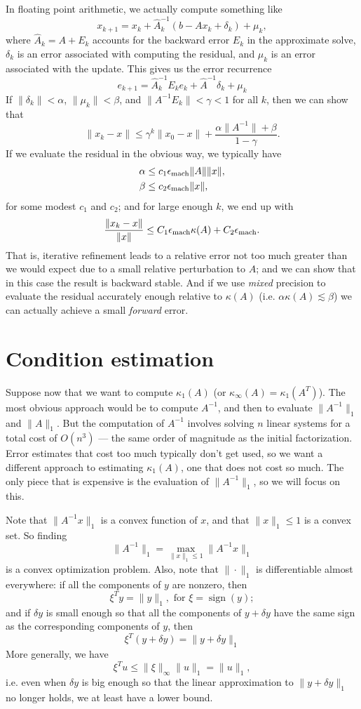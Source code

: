 \documentclass[12pt, leqno]{article} %
\begin{document}
In floating point arithmetic, we actually compute something like
\[
  x_{k+1} = x_k + \hat{A}_k^{-1} (b - A x_{k} + \delta_k) + \mu_k,
\]
where $\hat{A}_k = A + E_k$ accounts for the backward
error $E_k$ in the approximate solve,
$\delta_k$ is an error associated with computing the residual, and
$\mu_k$ is an error associated with the update.  This gives us the
error recurrence
\[
  e_{k+1} = \hat{A}_k^{-1} E_k e_k + \hat{A}^{-1} \delta_k + \mu_k
\]
If $\|\delta_k\| < \alpha$, $\|\mu_k\| < \beta$,
and $\|A^{-1} E_k\| < \gamma < 1$ for all $k$, then
we can show that
\[
  \|x_k-x\| \leq
    \gamma^k \|x_0-x\| +
    \frac{ \alpha \|A^{-1}\| + \beta }{1 - \gamma}.
\]
If we evaluate the residual in the obvious way, we typically have
\begin{align*}
  \alpha & \leq c_1 \epsilon_{\mathrm{mach}} \|A\| \|x\|, \\
  \beta & \leq c_2 \epsilon_{\mathrm{mach}} \|x\|,
\end{align*}
for some modest $c_1$ and $c_2$; and for large enough $k$, we end up with
\[
  \frac{\|x_k-x\|}{\|x\|} \leq C_1 \epsilon_{\mathrm{mach}} \kappa(A) + C_2 \epsilon_{\mathrm{mach}}.
\]
That is, iterative refinement leads to a relative error not too much
greater than we would expect due to a small relative perturbation to $A$;
and we can show that in this case the result is backward stable.
And if we use {\em mixed} precision to evaluate the residual accurately
enough relative to $\kappa(A)$ (i.e. $\alpha \kappa(A) \lesssim \beta$)
we can actually achieve a small {\em forward} error.


\section{Condition estimation}

Suppose now that we want to compute $\kappa_1(A)$
(or $\kappa_{\infty}(A) = \kappa_1(A^T)$).
The most obvious approach would be to compute $A^{-1}$, and then
to evaluate $\|A^{-1}\|_1$ and $\|A\|_1$.  But the computation of
$A^{-1}$ involves solving $n$ linear systems for a total cost of $O(n^3)$ ---
the same order of magnitude as the initial factorization.  Error estimates
that cost too much typically don't get used, so we want a different approach
to estimating $\kappa_1(A)$, one that does not cost so much.  The only piece
that is expensive is the evaluation of $\|A^{-1}\|_1$, so we will focus
on this.

Note that $\|A^{-1} x\|_1$ is a convex function of $x$, and that
$\|x\|_1 \leq 1$ is a convex set.  So finding
\[
  \|A^{-1}\|_1 = \max_{\|x\|_1 \leq 1} \|A^{-1} x\|_1
\]
is a convex optimization problem.  Also, note that $\|\cdot\|_1$ is
differentiable almost everywhere: if all the components of $y$ are
nonzero, then
\[
  \xi^T y = \|y\|_1, \mbox{ for } \xi = \operatorname{sign}(y);
\]
and if $\delta y$ is small enough so that all the components of $y + \delta y$
have the same sign as the corresponding components of $y$, then
\[
 \xi^T (y+\delta y) = \|y+\delta y\|_1
\]
More generally, we have
\[
  \xi^T u \leq \|\xi\|_{\infty} \|u\|_1 = \|u\|_1,
\]
i.e. even when $\delta y$ is big enough so that the linear approximation
to $\|y+\delta y\|_1$ no longer holds, we at least have a lower bound.
\end{document}

